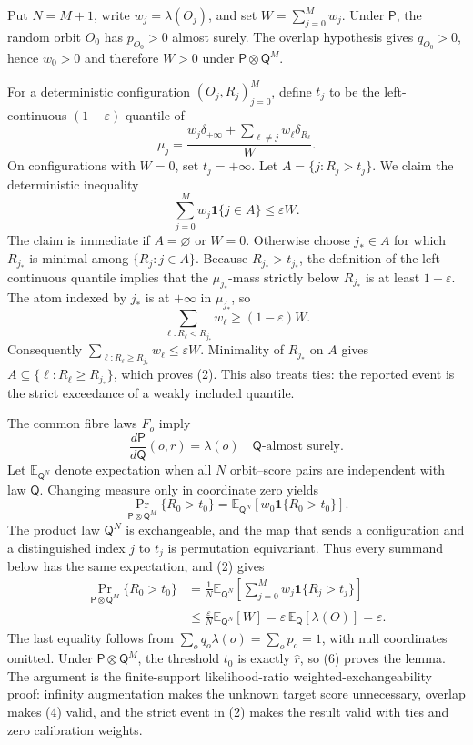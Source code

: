 Put \(N=M+1\), write \(w_j=\lambda(O_j)\), and set \(W=\sum_{j=0}^{M}w_j\). Under \(\mathsf P\), the random orbit \(O_0\) has \(p_{O_0}>0\) almost surely. The overlap hypothesis gives \(q_{O_0}>0\), hence \(w_0>0\) and therefore \(W>0\) under \(\mathsf P\otimes\mathsf Q^M\).

For a deterministic configuration \((O_j,R_j)_{j=0}^{M}\), define \(t_j\) to be the left-continuous \((1-\varepsilon)\)-quantile of
\[
\mu_j=\frac{w_j\delta_{+\infty}+\sum_{\ell\ne j}w_\ell\delta_{R_\ell}}{W}.
\tag{1}
\]
On configurations with \(W=0\), set \(t_j=+\infty\). Let \(A=\{j:R_j>t_j\}\). We claim the deterministic inequality
\[
\sum_{j=0}^{M}w_j\mathbf 1\{j\in A\}\le\varepsilon W.
\tag{2}
\]
The claim is immediate if \(A=\varnothing\) or \(W=0\). Otherwise choose \(j_*\in A\) for which \(R_{j_*}\) is minimal among \(\{R_j:j\in A\}\). Because \(R_{j_*}>t_{j_*}\), the definition of the left-continuous quantile implies that the \(\mu_{j_*}\)-mass strictly below \(R_{j_*}\) is at least \(1-\varepsilon\). The atom indexed by \(j_*\) is at \(+\infty\) in \(\mu_{j_*}\), so
\[
\sum_{\ell:R_\ell<R_{j_*}}w_\ell\ge(1-\varepsilon)W.
\tag{3}
\]
Consequently \(\sum_{\ell:R_\ell\ge R_{j_*}}w_\ell\le\varepsilon W\). Minimality of \(R_{j_*}\) on \(A\) gives \(A\subseteq\{\ell:R_\ell\ge R_{j_*}\}\), which proves (2). This also treats ties: the reported event is the strict exceedance of a weakly included quantile.

The common fibre laws \(F_o\) imply
\[
\frac{d\mathsf P}{d\mathsf Q}(o,r)=\lambda(o)
\quad\mathsf Q\text{-almost surely}.
\tag{4}
\]
Let \(\mathbb E_{\mathsf Q^N}\) denote expectation when all \(N\) orbit--score pairs are independent with law \(\mathsf Q\). Changing measure only in coordinate zero yields
\[
\Pr_{\mathsf P\otimes\mathsf Q^M}\{R_0>t_0\}
=\mathbb E_{\mathsf Q^N}\!\left[w_0\mathbf 1\{R_0>t_0\}\right].
\tag{5}
\]
The product law \(\mathsf Q^N\) is exchangeable, and the map that sends a configuration and a distinguished index \(j\) to \(t_j\) is permutation equivariant. Thus every summand below has the same expectation, and (2) gives
\[
\begin{aligned}
\Pr_{\mathsf P\otimes\mathsf Q^M}\{R_0>t_0\}
&=\frac1N\mathbb E_{\mathsf Q^N}\!\left[\sum_{j=0}^{M}w_j\mathbf 1\{R_j>t_j\}\right]\\
&\le\frac{\varepsilon}{N}\mathbb E_{\mathsf Q^N}[W]
=\varepsilon\,\mathbb E_{\mathsf Q}[\lambda(O)]
=\varepsilon.
\end{aligned}
\tag{6}
\]
The last equality follows from \(\sum_o q_o\lambda(o)=\sum_o p_o=1\), with null coordinates omitted. Under \(\mathsf P\otimes\mathsf Q^M\), the threshold \(t_0\) is exactly \(\widehat r\), so (6) proves the lemma. The argument is the finite-support likelihood-ratio weighted-exchangeability proof: infinity augmentation makes the unknown target score unnecessary, overlap makes (4) valid, and the strict event in (2) makes the result valid with ties and zero calibration weights.